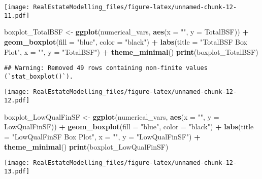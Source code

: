 \documentclass[
]{article}
\newenvironment{Shaded}{\begin{snugshade}}{\end{snugshade}}
\newcommand{\AttributeTok}[1]{\textcolor[rgb]{0.13,0.29,0.53}{#1}}
\newcommand{\FunctionTok}[1]{\textcolor[rgb]{0.13,0.29,0.53}{\textbf{#1}}}
\newcommand{\NormalTok}[1]{#1}
\newcommand{\OtherTok}[1]{\textcolor[rgb]{0.56,0.35,0.01}{#1}}
\newcommand{\SpecialCharTok}[1]{\textcolor[rgb]{0.81,0.36,0.00}{\textbf{#1}}}
\newcommand{\StringTok}[1]{\textcolor[rgb]{0.31,0.60,0.02}{#1}}
\begin{document}
\texttt{[image: RealEstateModelling\_files/figure-latex/unnamed-chunk-12-11.pdf]}

\begin{Shaded}
\begin{Highlighting}[]
\NormalTok{boxplot\_TotalBSF }\OtherTok{\textless{}{-}} \FunctionTok{ggplot}\NormalTok{(numerical\_vars, }\FunctionTok{aes}\NormalTok{(}\AttributeTok{x =} \StringTok{""}\NormalTok{, }\AttributeTok{y =}\NormalTok{ TotalBSF)) }\SpecialCharTok{+}
  \FunctionTok{geom\_boxplot}\NormalTok{(}\AttributeTok{fill =} \StringTok{"blue"}\NormalTok{, }\AttributeTok{color =} \StringTok{"black"}\NormalTok{) }\SpecialCharTok{+}
  \FunctionTok{labs}\NormalTok{(}\AttributeTok{title =} \StringTok{"TotalBSF Box Plot"}\NormalTok{, }\AttributeTok{x =} \StringTok{""}\NormalTok{, }\AttributeTok{y =} \StringTok{"TotalBSF"}\NormalTok{) }\SpecialCharTok{+}
  \FunctionTok{theme\_minimal}\NormalTok{()}
\FunctionTok{print}\NormalTok{(boxplot\_TotalBSF)}
\end{Highlighting}
\end{Shaded}

\begin{verbatim}
## Warning: Removed 49 rows containing non-finite values (`stat_boxplot()`).
\end{verbatim}

\texttt{[image: RealEstateModelling\_files/figure-latex/unnamed-chunk-12-12.pdf]}

\begin{Shaded}
\begin{Highlighting}[]
\NormalTok{boxplot\_LowQualFinSF }\OtherTok{\textless{}{-}} \FunctionTok{ggplot}\NormalTok{(numerical\_vars, }\FunctionTok{aes}\NormalTok{(}\AttributeTok{x =} \StringTok{""}\NormalTok{, }\AttributeTok{y =}\NormalTok{ LowQualFinSF)) }\SpecialCharTok{+}
  \FunctionTok{geom\_boxplot}\NormalTok{(}\AttributeTok{fill =} \StringTok{"blue"}\NormalTok{, }\AttributeTok{color =} \StringTok{"black"}\NormalTok{) }\SpecialCharTok{+}
  \FunctionTok{labs}\NormalTok{(}\AttributeTok{title =} \StringTok{"LowQualFinSF Box Plot"}\NormalTok{, }\AttributeTok{x =} \StringTok{""}\NormalTok{, }\AttributeTok{y =} \StringTok{"LowQualFinSF"}\NormalTok{) }\SpecialCharTok{+}
  \FunctionTok{theme\_minimal}\NormalTok{()}
\FunctionTok{print}\NormalTok{(boxplot\_LowQualFinSF)}
\end{Highlighting}
\end{Shaded}

\texttt{[image: RealEstateModelling\_files/figure-latex/unnamed-chunk-12-13.pdf]}
\end{document}
